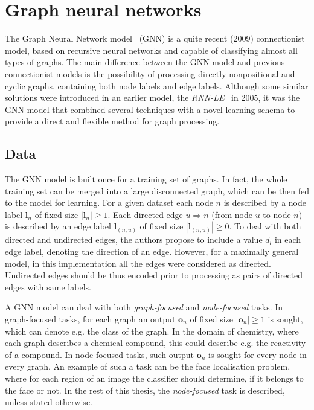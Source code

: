 
\chapter{Graph neural networks}

The Graph Neural Network model~\cite{scarselli2009graph} (GNN) is a quite recent (2009) connectionist model, based on recursive neural networks and capable of classifying almost all types of graphs. The main difference between the GNN model and previous connectionist models is the possibility of processing directly nonpositional and cyclic graphs, containing both node labels and edge labels. Although some similar solutions were introduced in an earlier model, the \emph{RNN-LE}~\cite{bianchini2005recursive} in 2005, it was the GNN model that combined several techniques with a novel learning schema to provide a direct and flexible method for graph processing.

\section{Data}
The GNN model is built once for a training set of graphs. In fact, the whole training set can be merged into a large disconnected graph, which can be then fed to the model for learning. For a given dataset each node $n$ is described by a node label $\bm{l}_n$ of fixed size $|\bm{l}_n| \geq 1$. Each directed edge $u \Rightarrow n$ (from node $u$ to node $n$) is described by an edge label $\bm{l}_{(n, u)}$ of fixed size $|\bm{l}_{(n, u)}| \geq 0$. To deal with both directed and undirected edges, the authors propose to include a value $d_l$ in each edge label, denoting the direction of an edge. However, for a maximally general model, in this implementation all the edges were considered as directed. Undirected edges should be thus encoded prior to processing as pairs of directed edges with same labels.

A GNN model can deal with both \emph{graph-focused} and \emph{node-focused} tasks. In graph-focused tasks, for each graph an output $\bm{o}_n$ of fixed size $|\bm{o}_n| \geq 1$ is sought, which can denote e.g. the class of the graph. In the domain of chemistry, where each graph describes a chemical compound, this could describe e.g. the reactivity of a compound. In node-focused tasks, such output $\bm{o}_n$ is sought for every node in every graph. An example of such a task can be the face localisation problem, where for each region of an image the classifier should determine, if it belongs to the face or not. In the rest of this thesis, the \emph{node-focused} task is described, unless stated otherwise.

